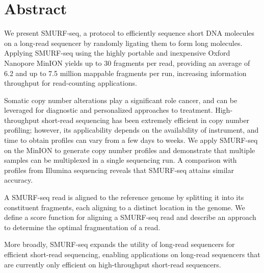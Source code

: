 \chapter*{Abstract}
We present SMURF-seq, a protocol to efficiently sequence short DNA
molecules on a long-read sequencer by randomly ligating them to form
long molecules.
%
Applying SMURF-seq using the highly portable and inexpensive Oxford
Nanopore MinION yields up to 30 fragments per read, providing an average
of 6.2 and up to 7.5 million mappable fragments per run, increasing
information throughput for read-counting applications.

Somatic copy number alterations play a significant role cancer, and can
be leveraged for diagnostic and personalized approaches to treatment.
High-throughput short-read sequencing has been extremely efficient in
copy number profiling; however, its applicability depends on the
availability of instrument, and time to obtain profiles can vary from a
few days to weeks.
We apply SMURF-seq on the MinION to generate copy number profiles and
demonstrate that multiple samples can be multiplexed in a single
sequencing run.  A comparison with profiles from Illumina sequencing
reveals that SMURF-seq attains similar accuracy.

A SMURF-seq read is aligned to the reference genome by splitting it into
its constituent fragments, each aligning to a distinct location in the
genome.
We define a score function for aligning a SMURF-seq read and describe an
approach to determine the optimal fragmentation of a read.

More broadly, SMURF-seq expands the utility of long-read sequencers for
efficient short-read sequencing, enabling applications on long-read
sequencers that are currently only efficient on high-throughput
short-read sequencers.
